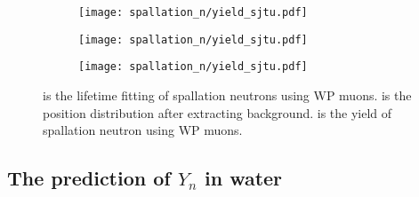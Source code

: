 \begin{figure}[h]
	\centering
	\begin{subfigure}{0.5\textwidth}
		\centering
		\texttt{[image: spallation\_n/yield\_sjtu.pdf]}
		\caption{}
		\label{fig:yield_sjtu8}
	\end{subfigure}%
	\begin{subfigure}{0.5\textwidth}
		\centering
		\texttt{[image: spallation\_n/yield\_sjtu.pdf]}
		\caption{}
		\label{fig:yield_sjtu11}
	\end{subfigure}
	\begin{subfigure}{0.5\textwidth}
		\centering
		\texttt{[image: spallation\_n/yield\_sjtu.pdf]}
		\caption{}
		\label{fig:yield_sjtu22}
	\end{subfigure}
	\caption{ is the lifetime fitting of spallation neutrons using WP muons.  is the position distribution after extracting background.  is the yield of spallation neutron using WP muons.}
	\label{fig:yield_sjtu_yield}
\end{figure}

\subsection{The prediction of $Y_n$ in water}

